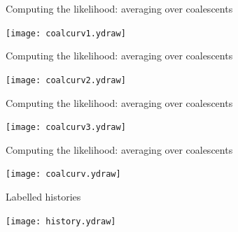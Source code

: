 \documentclass[bluish,slideColor,colorBG,pdf]{prosper}
\begin{document}
\begin{slide}[Replace]{Computing the likelihood: averaging over coalescents}

\centerline{\texttt{[image: coalcurv1.ydraw]}}

\end{slide}

\begin{slide}[Replace]{Computing the likelihood: averaging over coalescents}

\centerline{\texttt{[image: coalcurv2.ydraw]}}

\end{slide}

\begin{slide}[Replace]{Computing the likelihood: averaging over coalescents}

\centerline{\texttt{[image: coalcurv3.ydraw]}}

\end{slide}

\begin{slide}[Replace]{Computing the likelihood: averaging over coalescents}

\centerline{\texttt{[image: coalcurv.ydraw]}}

\end{slide}

\begin{slide}[Replace]{Labelled histories}

\centerline{\texttt{[image: history.ydraw]}}

\end{slide}
\end{document}
